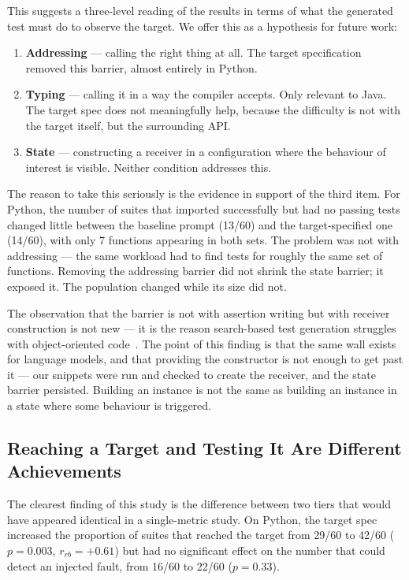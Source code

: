 This suggests a three-level reading of the results in terms of what the generated test must do
to observe the target. We offer this as a hypothesis for future work:

\begin{enumerate}
  \item \textbf{Addressing} --- calling the right thing at all. The target specification
    removed this barrier, almost entirely in Python.
  \item \textbf{Typing} --- calling it in a way the compiler accepts. Only relevant to Java.
    The target spec does not meaningfully help, because the difficulty is not with the target
    itself, but the surrounding API.
  \item \textbf{State} --- constructing a receiver in a configuration where the behaviour of
    interest is visible. Neither condition addresses this.
\end{enumerate}

The reason to take this seriously is the evidence in support of the third item. For Python,
the number of suites that imported successfully but had no passing tests changed little between
the baseline prompt (13/60) and the target-specified one (14/60), with only 7 functions
appearing in both sets. The problem was not with addressing --- the same workload had to find
tests for roughly the same set of functions. Removing the addressing barrier did not shrink
the state barrier; it exposed it. The population changed while its size did not.

The observation that the barrier is not with assertion writing but with receiver construction
is not new --- it is the reason search-based test generation struggles with object-oriented
code~\cite{fraser2014largescale,shamshiri2015realfaults}. The point of this finding is that the
same wall exists for language models, and that providing the constructor is not enough to get
past it --- our snippets were run and checked to create the receiver, and the state barrier
persisted. Building an instance is not the same as building an instance in a state where some
behaviour is triggered.

\subsection{Reaching a Target and Testing It Are Different Achievements}

The clearest finding of this study is the difference between two tiers that would have appeared
identical in a single-metric study. On Python, the target spec increased the proportion of
suites that reached the target from 29/60 to 42/60 ($p=0.003$, $r_{rb}=+0.61$) but had no
significant effect on the number that could detect an injected fault, from 16/60 to 22/60
($p=0.33$).

